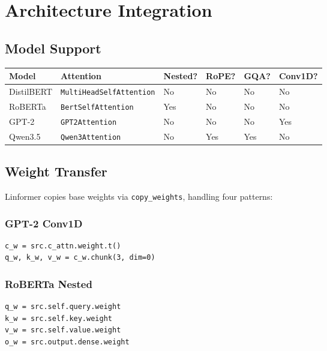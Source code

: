 \section{Architecture Integration}

\subsection{Model Support}

\begin{table}[H]
\centering
\small
\begin{tabular}{llllll}
\toprule
\textbf{Model} & \textbf{Attention} & \textbf{Nested?} & \textbf{RoPE?} & \textbf{GQA?} & \textbf{Conv1D?} \\
\midrule
DistilBERT & \texttt{MultiHeadSelfAttention} & No & No & No & No \\
RoBERTa & \texttt{BertSelfAttention} & Yes & No & No & No \\
GPT-2 & \texttt{GPT2Attention} & No & No & No & Yes \\
Qwen3.5 & \texttt{Qwen3Attention} & No & Yes & Yes & No \\
\bottomrule
\end{tabular}
\end{table}

\subsection{Weight Transfer}

Linformer copies base weights via \texttt{copy\_weights}, handling four patterns:

\subsubsection{GPT-2 Conv1D}

\begin{lstlisting}
c_w = src.c_attn.weight.t()
q_w, k_w, v_w = c_w.chunk(3, dim=0)
\end{lstlisting}

\subsubsection{RoBERTa Nested}

\begin{lstlisting}
q_w = src.self.query.weight
k_w = src.self.key.weight
v_w = src.self.value.weight
o_w = src.output.dense.weight
\end{lstlisting}

